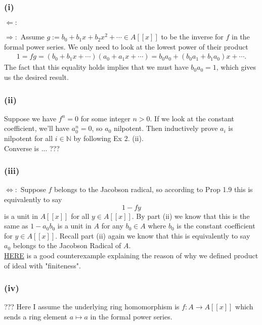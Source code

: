 \subsubsection{(i)} 

$\Leftarrow:$ 

\noindent $\Rightarrow:$ Assume $g:=b_0+b_1x+b_2x^2+\cdots\in A[[x]]$ to be the inverse for $f$ in the formal power series.
We only need to look at the lowest power of their product
\begin{align*}
    1=fg=(b_0+b_1x+\cdots)(a_0+a_1x+\cdots)=b_0a_0+(b_0a_1+b_1a_0)x+\cdots.
\end{align*}The fact that this equality holds implies that we must have $b_0a_0=1$, which gives us the desired result.

\subsubsection{(ii)} Suppose we have $f^n=0$ for some integer $n>0$. If we look at the constant coefficient, we'll have $a_0^n=0$, so $a_0$ nilpotent. Then inductively prove $a_i$ is nilpotent for all $i\in \mathbb N$ by following Ex 2. (ii).\\

Converse is ... ???

\subsubsection{(iii)} 

$\Leftrightarrow:$ Suppose $f$ belongs to the Jacobson radical, so according to Prop 1.9 this is equivalently to say
$$1-fy$$ is a unit in $A[[x]]$ for all $y\in A[[x]]$. By part (ii) we know that this is the same as $1-a_0b_0$ is a unit in $A$ for any $b_0\in A$ where $b_0$ is the constant coefficient for $y\in A[[x]]$. Recall part (ii) again we know that this is equivalently to say $a_0$ belongs to the Jacobson Radical of $A$.\\

\href{https://math.stackexchange.com/questions/367073/about-the-definition-of-extended-ideals}{HERE} is a good counterexample explaining the reason of why we defined product of ideal with "finiteness".

\subsubsection{(iv)}

??? Here I assume the underlying ring homomorphism is $f:A\to A[[x]]$ which sends a ring element $a\mapsto a$ in the formal power series.\\

